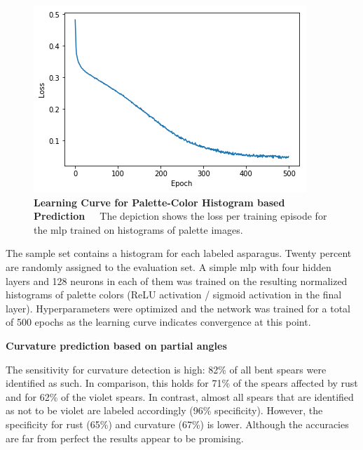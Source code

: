 \begin{figure}[!htb]
	\centering
	\includegraphics[scale=0.7]{Figures/chapter04/fe_palette_color.png}
	\decoRule
	\caption[Feature Engineering Learning Curve for Palette-Color Histogram based Prediction]{\textbf{Learning Curve for Palette-Color Histogram based Prediction}~~~The depiction shows the loss per training episode for the \acrshort{mlp} trained on histograms of palette images.}
	\label{fig:FeatureEngineeringPaletteColor}
\end{figure}

The sample set contains a histogram for each labeled asparagus. Twenty percent are randomly assigned to the evaluation set. A simple \acrshort{mlp} with four hidden layers and 128 neurons in each of them was trained on the resulting normalized histograms of palette colors (ReLU activation / sigmoid activation in the final layer). Hyperparameters were optimized and the network was trained for a total of 500 epochs as the learning curve indicates convergence at this point.

\bigskip
\textbf{Curvature prediction based on partial angles} 

The sensitivity for curvature detection is high: 82\% of all bent spears were identified as such. In comparison, this holds for 71\% of the spears affected by rust and for 62\% of the violet spears. In contrast, almost all spears that are identified as not to be violet are labeled accordingly (96\% specificity). However, the specificity for rust (65\%) and curvature (67\%) is lower. Although the accuracies are far from perfect the results appear to be promising.

